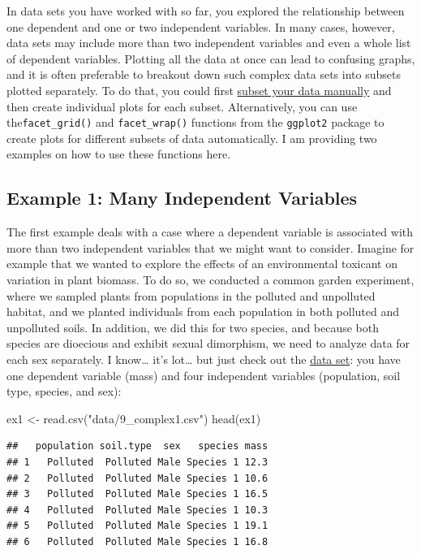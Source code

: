 \documentclass[
]{book}
\newenvironment{Shaded}{\begin{snugshade}}{\end{snugshade}}
\newcommand{\FunctionTok}[1]{\textcolor[rgb]{0.00,0.00,0.00}{#1}}
\newcommand{\NormalTok}[1]{#1}
\newcommand{\OtherTok}[1]{\textcolor[rgb]{0.56,0.35,0.01}{#1}}
\newcommand{\StringTok}[1]{\textcolor[rgb]{0.31,0.60,0.02}{#1}}
\begin{document}
In data sets you have worked with so far, you explored the relationship between one dependent and one or two independent variables. In many cases, however, data sets may include more than two independent variables and even a whole list of dependent variables. Plotting all the data at once can lead to confusing graphs, and it is often preferable to breakout down such complex data sets into subsets plotted separately. To do that, you could first \href{https://www.statmethods.net/management/subset.html}{subset your data manually} and then create individual plots for each subset. Alternatively, you can use the\texttt{facet\_grid()} and \texttt{facet\_wrap()} functions from the \texttt{ggplot2} package to create plots for different subsets of data automatically. I am providing two examples on how to use these functions here.

\hypertarget{example-1-many-independent-variables}{%
\subsection{Example 1: Many Independent Variables}\label{example-1-many-independent-variables}}

The first example deals with a case where a dependent variable is associated with more than two independent variables that we might want to consider. Imagine for example that we wanted to explore the effects of an environmental toxicant on variation in plant biomass. To do so, we conducted a common garden experiment, where we sampled plants from populations in the polluted and unpolluted habitat, and we planted individuals from each population in both polluted and unpolluted soils. In addition, we did this for two species, and because both species are dioecious and exhibit sexual dimorphism, we need to analyze data for each sex separately. I know\ldots{} it's lot\ldots{} but just check out the \href{data/9_complex1.csv}{data set}: you have one dependent variable (mass) and four independent variables (population, soil type, species, and sex):

\begin{Shaded}
\begin{Highlighting}[]
\NormalTok{ex1 }\OtherTok{\textless{}{-}} \FunctionTok{read.csv}\NormalTok{(}\StringTok{"data/9\_complex1.csv"}\NormalTok{)}
\FunctionTok{head}\NormalTok{(ex1)}
\end{Highlighting}
\end{Shaded}

\begin{verbatim}
##   population soil.type  sex   species mass
## 1   Polluted  Polluted Male Species 1 12.3
## 2   Polluted  Polluted Male Species 1 10.6
## 3   Polluted  Polluted Male Species 1 16.5
## 4   Polluted  Polluted Male Species 1 10.3
## 5   Polluted  Polluted Male Species 1 19.1
## 6   Polluted  Polluted Male Species 1 16.8
\end{verbatim}
\end{document}
